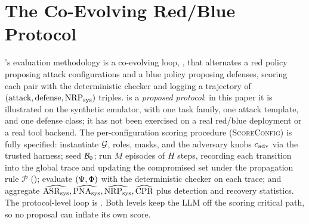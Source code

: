 \section{The \corb{} Co-Evolving Red/Blue Protocol}
\label{sec:algorithm}

's evaluation methodology is a co-evolving loop, \corb, that alternates a red
policy proposing attack configurations and a blue policy proposing defenses, scoring each
pair with the deterministic checker and logging a trajectory of
$(\text{attack},\text{defense},\mathrm{NRP}_{\mathrm{sys}})$ triples. \corb{} is a \emph{proposed protocol}: in
this paper it is illustrated on the synthetic emulator, with one task family, one attack
template, and one defense class; it has not been exercised on a real red/blue deployment
or a real tool backend. The per-configuration scoring procedure
(\textsc{ScoreConfig}) is fully specified: instantiate $\mathcal{G}$, roles, masks, and the
adversary knobs $c_{\mathrm{adv}}$ via the trusted harness; seed
$\mathcal{B}_0$; run $M$ episodes of $H$ steps, recording each transition into the global
trace and updating the compromised set under the propagation rule $\mathcal{P}$
(); evaluate $(\Psi,\Phi)$ with the deterministic checker on
each trace; and aggregate $\widehat{\mathrm{ASR}_{\mathrm{sys}}},\widehat{\mathrm{PNA}_{\mathrm{sys}}},\widehat{\mathrm{NRP}_{\mathrm{sys}}},\widehat{\mathrm{CPR}}$
plus detection and recovery statistics. The protocol-level loop is . Both
levels keep the LLM off the scoring critical path, so no proposal can inflate its own
score.

\begin{algorithm}[t]
\caption{\corb: co-evolving red/blue evaluation.}
\label{alg:corb}
\algreset
{}
\Ind
{}
\Ded
{}
\end{algorithm}


